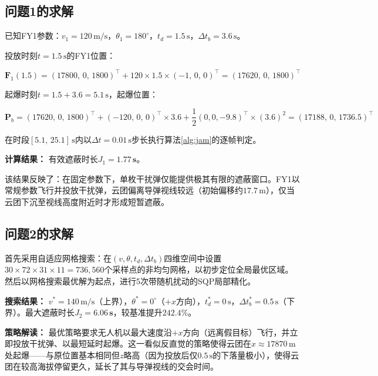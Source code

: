 \documentclass[12pt,a4paper]{ctexart}
\newcommand{\vect}[1]{\boldsymbol{#1}}
\begin{document}
\subsection{问题1的求解}

已知FY1参数：$v_1 = 120\,\text{m/s}$，$\theta_1 = 180^\circ$，$t_d = 1.5\,\text{s}$，$\Delta t_b = 3.6\,\text{s}$。

投放时刻$t = 1.5\,\text{s}$的FY1位置：

\begin{equation}
\vect{F}_1(1.5) = (17800,\,0,\,1800)^\top + 120 \times 1.5 \times (-1,\,0,\,0)^\top = (17620,\,0,\,1800)^\top
\end{equation}

起爆时刻$t = 1.5 + 3.6 = 5.1\,\text{s}$，起爆位置：

\begin{equation}
\vect{P}_b = (17620,\,0,\,1800)^\top + (-120,\,0,\,0)^\top \times 3.6 + \frac{1}{2}(0,0,-9.8)^\top \times (3.6)^2 = (17188,\,0,\,1736.5)^\top
\end{equation}

在时段$[5.1,\,25.1]\,\text{s}$内以$\Delta t = 0.01\,\text{s}$步长执行算法\ref{alg:jam}的逐帧判定。

\textbf{计算结果：} 有效遮蔽时长$J_1 = \mathbf{1.77\,\text{s}}$。

该结果反映了：在固定参数下，单枚干扰弹仅能提供极其有限的遮蔽窗口。FY1以常规参数飞行并投放干扰弹，云团偏离导弹视线较远（初始偏移约$17.7\,\text{m}$），仅当云团下沉至视线高度附近时才形成短暂遮蔽。

\subsection{问题2的求解}

首先采用自适应网格搜索：在$(v,\theta,t_d,\Delta t_b)$四维空间中设置$30 \times 72 \times 31 \times 11 = 736{,}560$个采样点的非均匀网格，以初步定位全局最优区域。然后以网格搜索最优解为起点，进行5次带随机扰动的SQP局部精化。

\textbf{搜索结果：} $v^* = 140\,\text{m/s}$（上界），$\theta^* = 0^\circ$（$+x$方向），$t_d^* = 0\,\text{s}$，$\Delta t_b^* = 0.5\,\text{s}$（下界）。最大遮蔽时长$J_2 = \mathbf{6.06\,\text{s}}$，较基准提升$\mathbf{242.4\%}$。

\textbf{策略解读：} 最优策略要求无人机以最大速度沿$+x$方向（远离假目标）飞行，并立即投放干扰弹、以最短延时起爆。这一看似反直觉的策略使得云团在$x \approx 17870\,\text{m}$处起爆——与原位置基本相同但$z$略高（因为投放后仅$0.5\,\text{s}$的下落量极小），使得云团在较高海拔停留更久，延长了其与导弹视线的交会时间。
\end{document}
